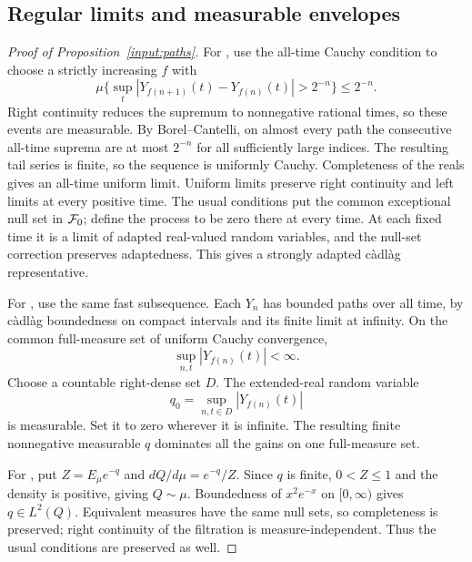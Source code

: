 \subsection{Regular limits and measurable envelopes}
\label{sec:path-inputs}
\begin{proof}[Proof of Proposition~\ref{input:paths}]
For , use the all-time Cauchy condition to choose a strictly increasing $f$ with
\[
 \mu\{\sup_t|Y_{f(n+1)}(t)-Y_{f(n)}(t)|>2^{-n}\}\leq2^{-n}.
\]
Right continuity reduces the supremum to nonnegative rational times, so these events are measurable.
By Borel--Cantelli, on almost every path the consecutive all-time suprema are at most $2^{-n}$ for all sufficiently large indices.
The resulting tail series is finite, so the sequence is uniformly Cauchy. Completeness of the reals gives an all-time uniform limit.
Uniform limits preserve right continuity and left limits at every positive time.
The usual conditions put the common exceptional null set in $\mathcal F_0$; define the process to be zero there at every time.
At each fixed time it is a limit of adapted real-valued random variables, and the null-set correction preserves adaptedness.
This gives a strongly adapted c\`adl\`ag representative.

For , use the same fast subsequence. Each $Y_n$ has bounded paths over all time,
by c\`adl\`ag boundedness on compact intervals and its finite limit at infinity.
On the common full-measure set of uniform Cauchy convergence,
\[\sup_{n,t}|Y_{f(n)}(t)|<\infty.\]
Choose a countable right-dense set $D$. The extended-real random variable
\[q_0=\sup_{n,t\in D}|Y_{f(n)}(t)|\]
is measurable. Set it to zero wherever it is infinite.
The resulting finite nonnegative measurable $q$ dominates all the gains on one full-measure set.

For , put $Z=E_\mu e^{-q}$ and $dQ/d\mu=e^{-q}/Z$.
Since $q$ is finite, $0<Z\leq1$ and the density is positive, giving $Q\sim\mu$.
Boundedness of $x^2e^{-x}$ on $[0,\infty)$ gives $q\in L^2(Q)$.
Equivalent measures have the same null sets, so completeness is preserved; right continuity of the filtration is measure-independent.
Thus the usual conditions are preserved as well.
\end{proof}
